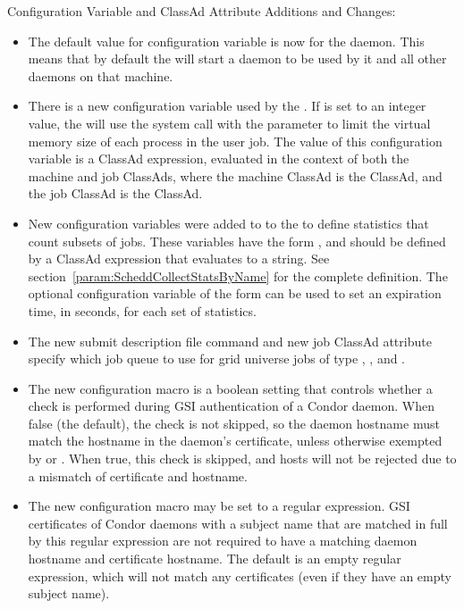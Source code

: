 \noindent Configuration Variable and ClassAd Attribute Additions and Changes:

\begin{itemize}

\item The default value for configuration variable 
is now  for the  daemon.  
This means that by
default the  will start a  daemon to be used 
by it and all other daemons on that machine.

\item There is a new configuration variable used by the .
If  is set to an integer value, 
the 
will use the  system call with the 
 parameter to
limit the virtual memory size of each process in the user job.  
The value of this configuration variable is a ClassAd expression, 
evaluated in the context of both the machine and job ClassAds, 
where the machine ClassAd is the  ClassAd, 
and the job ClassAd is the  ClassAd.

\item New configuration variables were added to to the  to
define statistics that count subsets of jobs. 
These variables have the form ,
and should be defined by a ClassAd expression that evaluates to a string.
See section~\ref{param:ScheddCollectStatsByName}
for the complete definition.
The optional configuration variable of the form
 can be used to set an expiration time,
in seconds, for each set of statistics.

\item The new  submit description file command
and new job ClassAd attribute  specify which job
queue to use for grid universe jobs of type
, , and .

\item The new configuration macro  is
a boolean setting that controls whether a check is performed during
GSI authentication of a Condor daemon.  When false (the default),
the check is not skipped, so the daemon hostname must match the
hostname in the daemon's certificate, unless otherwise exempted
by  or
.
When true, this check is skipped, and hosts will not be rejected
due to a mismatch of certificate and hostname.

\item The new configuration macro
 may be set to a
regular expression.  GSI certificates of Condor daemons with a
subject name that are matched in full by this regular expression
are not required to have a matching daemon hostname and certificate
hostname.  The default is an empty regular expression, which will
not match any certificates (even if they have an empty subject name).

\end{itemize}

